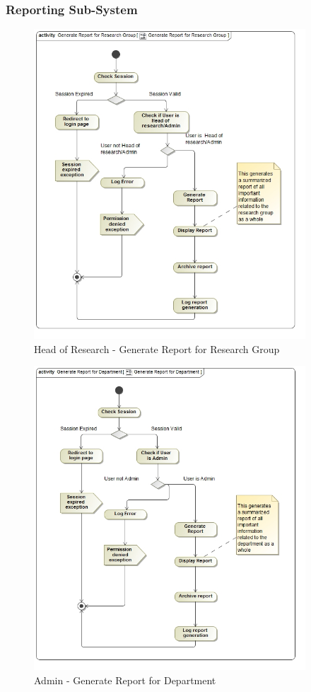 \documentclass{article}
\begin{document}
			\subsubsection{Reporting Sub-System}
			\begin{figure}[H]
				\includegraphics[width=4in, center]{../Diagrams/Process Specifications/Reporting subsystem/Generate Report for Research Group.jpg}
				\caption{Head of Research - Generate Report for Research Group}
			\end{figure}
			\begin{figure}[H]
				\includegraphics[width=4in, center]{../Diagrams/Process Specifications/Reporting subsystem/Generate Report for Department.jpg}
				\caption{Admin - Generate Report for Department}
			\end{figure}
\end{document}
